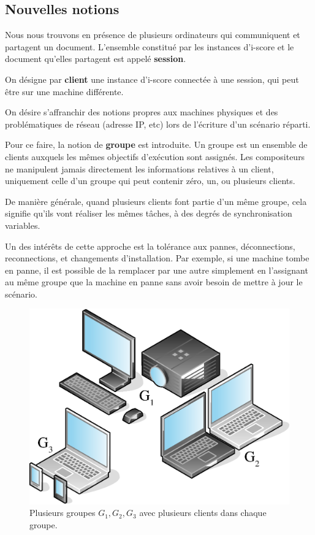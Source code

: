 \documentclass{article}
\newcommand\vocab[1]{\textbf{#1}}
\begin{document}
\subsection{Nouvelles notions}
Nous nous trouvons en présence de plusieurs ordinateurs qui communiquent et partagent un document.
L'ensemble constitué par les instances d'i-score et le document qu'elles partagent est appelé \vocab{session}.

On désigne par \vocab{client} une instance d'i-score connectée à une session, qui peut être sur une machine différente.

On désire s'affranchir des notions propres aux machines physiques et des problématiques de réseau (adresse IP, etc) lors de l'écriture 
d'un scénario réparti. 

Pour ce faire, la notion de \vocab{groupe} est introduite. 
Un groupe est un ensemble de clients auxquels les mêmes objectifs d'exécution sont assignés.
Les compositeurs ne manipulent jamais directement les informations relatives à un client, uniquement celle d'un groupe qui peut contenir zéro, un, ou plusieurs clients.

De manière générale, quand plusieurs clients font partie d'un même groupe, cela signifie qu'ils vont réaliser les mêmes tâches, à des degrés de synchronisation variables.

Un des intérêts de cette approche est la tolérance aux pannes, déconnections, reconnections, et changements d'installation. 
Par exemple, si une machine tombe en panne, il est possible de la remplacer par une autre simplement en l'assignant au même groupe que la machine en panne 
sans avoir besoin de mettre à jour le scénario.


\begin{figure}[h]
	\centering
	\includegraphics[scale=0.4]{images/groupes.eps}
	\caption{Plusieurs groupes $G_1,G_2,G_3$ avec plusieurs clients dans chaque groupe.}
	\label{img.groupes}
\end{figure}
\end{document}
